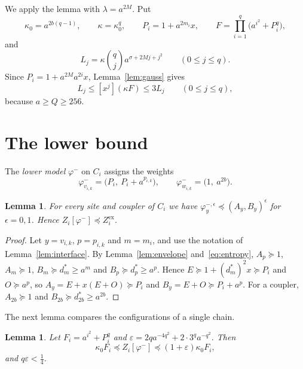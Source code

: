 \documentclass[11pt]{amsart}
\newtheorem{lemma}[theorem]{Lemma}
\theoremstyle{definition}
\theoremstyle{remark}
\numberwithin{equation}{section}
\newcommand{\coef}[2]{[x^{#1}]#2}
\begin{document}
We apply the lemma with $\lambda=a^{2M}$. Put
\begin{equation}\label{eq:L}
\kappa_0=a^{2b(q-1)},\qquad \kappa=\kappa_0^q,\qquad P_i=1+a^{2m_i}x,\qquad F=\prod_{i=1}^q\bigl(a^{i^2}+P_i^q\bigr),
\end{equation}
and
\[
L_j=\kappa\binom qja^{\sigma+2Mj+j^2}\qquad(0\le j\le q).
\]
Since $P_i=1+a^{2M}a^{2i}x$, Lemma~\ref{lem:gauss} gives
\begin{equation}\label{eq:KF}
L_j\le\coef j{(\kappa F)}\le3L_j\qquad(0\le j\le q),
\end{equation}
because $a\ge Q\ge256$.

\section{The lower bound}\label{sec:lower}

The \emph{lower model} $\varphi^-$ on $C_i$ assigns the weights
\[
\varphi^-_{v_{i,k}}=\bigl(P_i,\ P_i+a^{p_{i,k}}\bigr),\qquad\varphi^-_{w_{i,k}}=\bigl(1,\ a^{2b}\bigr).
\]

\begin{lemma}\label{lem:lower-weights}
For every site and coupler of $C_i$ we have $\varphi^{-,\epsilon}_y\preceq(A_y,B_y)^\epsilon$ for $\epsilon=0,1$. Hence $Z_i[\varphi^-]\preceq Z_i^{\mathrm{ex}}$.
\end{lemma}

\begin{proof}
Let $y=v_{i,k}$, $p=p_{i,k}$ and $m=m_i$, and use the notation of Lemma~\ref{lem:interface}. By Lemma~\ref{lem:envelope} and~\eqref{eq:entropy}, $A_p\succeq1$, $A_m\succeq1$, $B_m\succeq d_m^\ast\ge a^m$ and $B_p\succeq d_p^\ast\ge a^p$. Hence $E\succeq1+(d_m^\ast)^2x\succeq P_i$ and $O\succeq a^p$, so $A_y=E+x(E+O)\succeq P_i$ and $B_y=E+O\succeq P_i+a^p$. For a coupler, $A_{2b}\succeq1$ and $B_{2b}\succeq d^\ast_{2b}\ge a^{2b}$.
\end{proof}

The next lemma compares the configurations of a single chain.

\begin{lemma}\label{lem:phase}
Let $F_i=a^{i^2}+P_i^q$ and $\varepsilon=2qa^{-4q^2}+2\cdot3^qa^{-q^2}$. Then
\[
\kappa_0F_i\preceq Z_i[\varphi^-]\preceq(1+\varepsilon)\kappa_0F_i,
\]
and $q\varepsilon<\frac14$.
\end{lemma}
\end{document}
